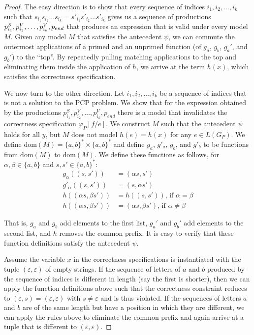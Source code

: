 \begin{proof}
The easy direction is to show that every sequence of indices $i_1,i_2,\dots,i_k$ such that $s_{i_1}s_{i_2}\dots s_{i_k} = s'_{i_1}s'_{i_2}\dots s'_{i_k}$ gives us a sequence of productions $p^S_{i_1}, p^V_{i_2},\dots,p^V_{i_k},\linebreak p_{end}$ that produces an expression that is valid under every model $M$.
Given any model $M$ that satisfies the antecedent $\psi$, we can commute the outermost applications of a primed and an unprimed function (of $g_a$, $g_b$, $g_a'$, and $g_b'$) to the ``top''. 
By repeatedly pulling matching applications to the top and eliminating them inside the application of $h$, we arrive at the term $h(x)$, which satisfies the correctness specification.






We now turn to the other direction. 
Let $i_1,i_2,\dots,i_k$ be a sequence of indices that is not a solution to the PCP problem. 
We show that for the expression obtained by the productions $p^S_{i_1}, p^V_{i_2},\dots,p^V_{i_k}, p_{end}$ there is a model that invalidates the correctness specification $\varphi_P[f / e]$. 
We construct $M$ such that the antecedent $\psi$ holds for all $y$, but $M$ does not model $h(e) = h(x)$ for any $e \in L(G_P)$. 
We define $\text{dom}(M) = \{a,b\}^* \times \{a,b\}^*$ and define $g_a$, $g'_a$, $g_b$, and $g'_b$ to be functions from  $\text{dom}(M)$ to $\text{dom}(M)$. 
We define these functions as follows, for $\alpha,\beta \in \{a,b\}$ and $s,s' \in \{a,b\}^*$:
\begin{align*}
g_\alpha((s,s')) &= (\alpha s, s')\\
g'_\alpha((s,s')) &= (s, \alpha s') \\
h((\alpha s, \beta s')) &= h((s,s')) \text{, if } \alpha = \beta\\
h((\alpha s, \beta s')) &= (\alpha s, \beta s') \text{, if } \alpha \neq \beta
\end{align*}

That is, $g_a$ and $g_b$ add elements to the first list, $g_a'$ and $g_b'$ add elements to the second list, and $h$ removes the common prefix. 
It is easy to verify that these function definitions satisfy the antecedent $\psi$.

Assume the variable $x$ in the correctness specifications is instantiated with the tuple $(\varepsilon,\varepsilon)$ of empty strings. 
If the sequence of letters of $a$ and $b$ produced by the sequence of indices is different in length (say the first is shorter), then we can apply the function definitions above such that the correctness constraint reduces to $(\varepsilon,s)=(\varepsilon,\varepsilon)$ with $s\neq \varepsilon$ and is thus violated. 
If the sequences of letters $a$ and $b$ are of the same length but have a position in which they are different, we can apply the rules above to eliminate the common prefix and again arrive at a tuple that is different to $(\varepsilon,\varepsilon)$.


\end{proof}
